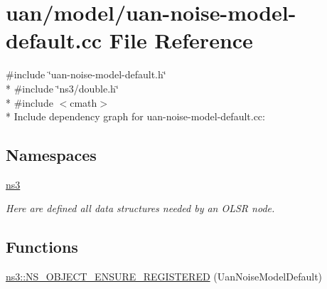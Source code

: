 \hypertarget{uan-noise-model-default_8cc}{}\section{uan/model/uan-\/noise-\/model-\/default.cc File Reference}
\label{uan-noise-model-default_8cc}
{\ttfamily \#include \char`\"{}uan-\/noise-\/model-\/default.\+h\char`\"{}}\\*
{\ttfamily \#include \char`\"{}ns3/double.\+h\char`\"{}}\\*
{\ttfamily \#include $<$cmath$>$}\\*
Include dependency graph for uan-\/noise-\/model-\/default.cc\+:
\subsection*{Namespaces}
\begin{DoxyCompactItemize}
\item 
 \hyperlink{namespacens3}{ns3}
\begin{DoxyCompactList}\small\item\em Here are defined all data structures needed by an O\+L\+SR node. \end{DoxyCompactList}\end{DoxyCompactItemize}
\subsection*{Functions}
\begin{DoxyCompactItemize}
\item 
\hyperlink{namespacens3_aeeda69a33a6faca3c3939b16cf1184b9}{ns3\+::\+N\+S\+\_\+\+O\+B\+J\+E\+C\+T\+\_\+\+E\+N\+S\+U\+R\+E\+\_\+\+R\+E\+G\+I\+S\+T\+E\+R\+ED} (Uan\+Noise\+Model\+Default)
\end{DoxyCompactItemize}
